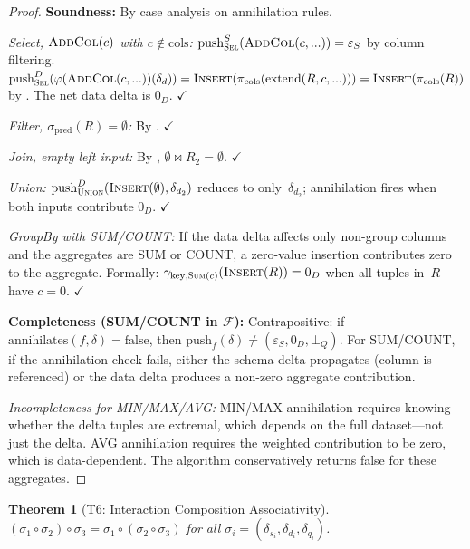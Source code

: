 \documentclass[11pt,a4paper]{article}
\newtheorem{theorem}{Theorem}[section]
\theoremstyle{definition}
\newcommand{\epsS}{\varepsilon_S}
\newcommand{\zeroD}{0_D}
\newcommand{\botQ}{\bot_Q}
\newcommand{\push}{\mathrm{push}}
\newcommand{\ann}{\mathrm{annihilates}}
\newcommand{\FragF}{\mathcal{F}}
\begin{document}
\begin{proof}
\textbf{Soundness:} By case analysis on annihilation rules.

\emph{Select, $\textsc{AddCol}(c)$ with $c \notin \mathrm{cols}$:}
$\push_{\textsc{Sel}}^S(\textsc{AddCol}(c,...)) = \epsS$ by column filtering.
$\push_{\textsc{Sel}}^D(\varphi(\textsc{AddCol}(c,...))(\delta_d))
= \textsc{Insert}(\pi_{\mathrm{cols}}(\mathrm{extend}(R,c,...)))
= \textsc{Insert}(\pi_{\mathrm{cols}}(R))$
by .  The net data delta is $\zeroD$. $\checkmark$

\emph{Filter, $\sigma_{\mathrm{pred}}(R) = \emptyset$:}
By . $\checkmark$

\emph{Join, empty left input:}
By , $\emptyset \bowtie R_2 = \emptyset$. $\checkmark$

\emph{Union:}
$\push_{\textsc{Union}}^D(\textsc{Insert}(\emptyset), \delta_{d_2})$ reduces
to only~$\delta_{d_2}$; annihilation fires when both inputs contribute $\zeroD$.
$\checkmark$

\emph{GroupBy with SUM/COUNT:}
If the data delta affects only non-group columns and the aggregates are SUM or
COUNT, a zero-value insertion contributes zero to the aggregate.  Formally:
$\gamma_{\mathrm{key},\textsc{Sum}(c)}(\textsc{Insert}(R)) = \zeroD$ when all
tuples in~$R$ have $c = 0$. $\checkmark$

\textbf{Completeness (SUM/COUNT in $\FragF$):}
Contrapositive: if $\ann(f, \delta) = \mathrm{false}$, then
$\push_f(\delta) \neq (\epsS, \zeroD, \botQ)$.  For SUM/COUNT, if the
annihilation check fails, either the schema delta propagates (column is
referenced) or the data delta produces a non-zero aggregate contribution.

\emph{Incompleteness for MIN/MAX/AVG:}
MIN/MAX annihilation requires knowing whether the delta tuples are extremal,
which depends on the full dataset---not just the delta.  AVG annihilation
requires the weighted contribution to be zero, which is data-dependent.
The algorithm conservatively returns false for these aggregates.
\end{proof}

\begin{theorem}[T6: Interaction Composition Associativity]\label{thm:associativity}
$(\sigma_1 \circ \sigma_2) \circ \sigma_3 = \sigma_1 \circ (\sigma_2 \circ \sigma_3)$
for all $\sigma_i = (\delta_{s_i}, \delta_{d_i}, \delta_{q_i})$.
\end{theorem}
\end{document}
